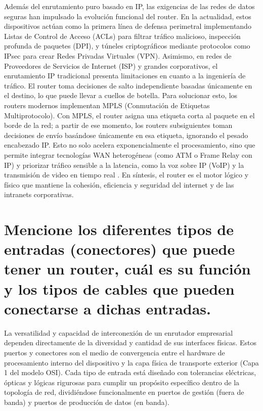 \documentclass[a4paper,12pt]{article}
\begin{document}
Además del enrutamiento puro basado en IP, las exigencias de las redes de datos seguras han impulsado la evolución funcional del router. En la actualidad, estos dispositivos actúan como la primera línea de defensa perimetral implementando Listas de Control de Acceso (ACLs) para filtrar tráfico malicioso, inspección profunda de paquetes (DPI), y túneles criptográficos mediante protocolos como IPsec para crear Redes Privadas Virtuales (VPN). Asimismo, en redes de Proveedores de Servicios de Internet (ISP) y grandes corporativos, el enrutamiento IP tradicional presenta limitaciones en cuanto a la ingeniería de tráfico. El router toma decisiones de salto independiente basadas únicamente en el destino, lo que puede llevar a cuellos de botella. Para solucionar esto, los routers modernos implementan MPLS (Conmutación de Etiquetas Multiprotocolo). Con MPLS, el router asigna una etiqueta corta al paquete en el borde de la red; a partir de ese momento, los routers subsiguientes toman decisiones de envío basándose únicamente en esa etiqueta, ignorando el pesado encabezado IP. Esto no solo acelera exponencialmente el procesamiento, sino que permite integrar tecnologías WAN heterogéneas (como ATM o Frame Relay con IP) y priorizar tráfico sensible a la latencia, como la voz sobre IP (VoIP) y la transmisión de video en tiempo real \cite{mpls_presentation}. En síntesis, el router es el motor lógico y físico que mantiene la cohesión, eficiencia y seguridad del internet y de las intranets corporativas.

\section{Mencione los diferentes tipos de entradas (conectores) que puede tener un router, cuál es su función y los tipos de cables que pueden conectarse a dichas entradas.}

La versatilidad y capacidad de interconexión de un enrutador empresarial dependen directamente de la diversidad y cantidad de sus interfaces físicas. Estos puertos y conectores son el medio de convergencia entre el hardware de procesamiento interno del dispositivo y la capa física de transporte exterior (Capa 1 del modelo OSI). Cada tipo de entrada está diseñado con tolerancias eléctricas, ópticas y lógicas rigurosas para cumplir un propósito específico dentro de la topología de red, dividiéndose funcionalmente en puertos de gestión (fuera de banda) y puertos de producción de datos (en banda).
\end{document}
